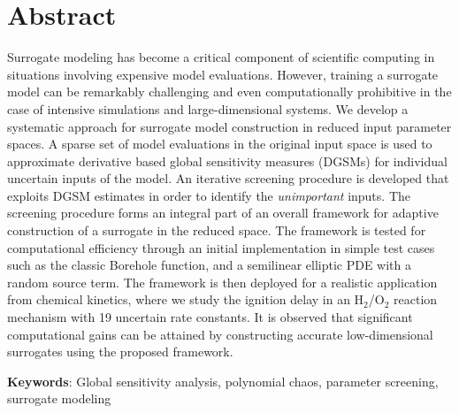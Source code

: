 \section*{Abstract}
Surrogate modeling has become a critical component of scientific computing
in situations involving expensive model evaluations. However, training a
surrogate model can be remarkably challenging and even computationally
prohibitive in the case of intensive simulations and large-dimensional
systems.
We develop a systematic approach for surrogate model
construction in reduced input parameter spaces.
%
A sparse set of model evaluations in the original input space is used to  
approximate derivative based global sensitivity measures (DGSMs) 
for individual uncertain inputs of the model.
An iterative screening procedure is developed that exploits DGSM estimates in
order to identify the \emph{unimportant} inputs. The screening procedure forms
an integral part of an overall framework for adaptive construction of a
surrogate in the reduced space. The framework is tested for computational
efficiency through an initial implementation in simple test cases such as the
classic Borehole function, and a semilinear elliptic PDE with a random source
term. 
The framework is then deployed for a realistic application from chemical
kinetics, where we study the ignition delay in an H$_2$/O$_2$ reaction
mechanism with 19 uncertain rate constants.  It is observed that significant
computational gains can be attained by constructing accurate low-dimensional
surrogates using the proposed framework.
\vspace{2mm}

\noindent
\textbf{Keywords}: Global sensitivity analysis,
polynomial chaos, parameter screening, surrogate modeling
 
